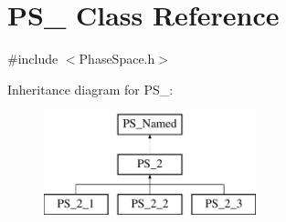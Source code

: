 \hypertarget{classPS__2}{\section{P\-S\-\_ Class Reference}
\label{classPS__2}
}


{\ttfamily \#include $<$Phase\-Space.\-h$>$}

Inheritance diagram for P\-S\-\_\-:\begin{figure}[H]
\begin{center}
\leavevmode
\includegraphics[height=3.000000cm]{classPS__2}
\end{center}
\end{figure}
